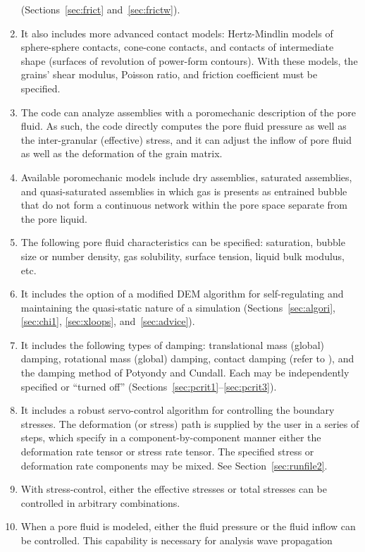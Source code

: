 \documentclass[letterpaper,11pt]{article}
\begin{document}
\begin{enumerate}
(Sections~\ref{sec:frict} and~\ref{sec:frictw}).
\item
It also includes more advanced contact models:
Hertz-Mindlin models of sphere-sphere contacts, cone-cone contacts,
and contacts of intermediate shape (surfaces of revolution
of power-form contours).
With these models, the grains' shear modulus,
Poisson ratio, and friction coefficient must be specified.
\item
The code can analyze assemblies with a poromechanic description
of the pore fluid.
As such, the code directly computes the pore fluid pressure
as well as the inter-granular (effective) stress,
and it can adjust the inflow of pore fluid as well as the
deformation of the grain matrix.
\item
Available poromechanic models include dry assemblies,
saturated assemblies, and quasi-saturated assemblies in which
gas is presents as entrained bubble that do not form
a continuous network within the pore space separate from
the pore liquid.
\item
The following pore fluid characteristics can be specified:
saturation, bubble size or number density, gas solubility,
surface tension, liquid bulk modulus, etc.
\item
It includes the option of a modified DEM algorithm for self-regulating 
and maintaining
the quasi-static nature of a simulation (Sections~\ref{sec:algori},
\ref{sec:chi1}, \ref{sec:xloops}, and~\ref{sec:advice}).
\item
It includes the following types of damping:  
translational mass (global) damping,
rotational mass (global) damping, contact damping
(refer to ),
and the damping method of Potyondy and Cundall.  
Each may be
independently specified or ``turned off''
(Sections~\ref{sec:pcrit1}--\ref{sec:pcrit3}).
\item
It includes a robust servo-control 
algorithm for controlling the boundary stresses.
The deformation (or stress) path is supplied by the
user in a series of steps, which
specify in a component-by-component manner either the deformation rate 
tensor or stress rate tensor.  The specified stress or deformation rate 
components may be mixed.  See Section~\ref{sec:runfile2}.
\item
With stress-control, either the effective stresses or total stresses
can be controlled in arbitrary combinations.
\item
When a pore fluid is modeled, either the fluid pressure or
the fluid inflow can be controlled.
This capability is necessary for analysis wave propagation

\end{enumerate}
\end{document}
